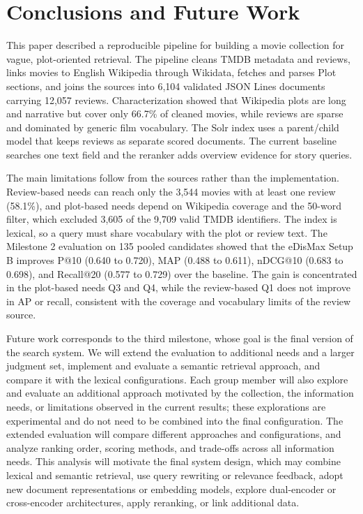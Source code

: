 \documentclass[sigconf]{acmart}
\begin{document}
\section{Conclusions and Future Work}
This paper described a reproducible pipeline for building a movie collection for vague,
plot-oriented retrieval. The pipeline cleans TMDB metadata and reviews, links movies to
English Wikipedia through Wikidata, fetches and parses Plot sections, and joins the
sources into 6{,}104 validated JSON Lines documents carrying 12{,}057 reviews.
Characterization showed that Wikipedia plots are long and narrative but cover only
66.7\% of cleaned movies, while reviews are sparse and dominated by generic film
vocabulary. The Solr index uses a parent/child model that keeps reviews as separate
scored documents. The current baseline searches one text field and the reranker
adds overview evidence for story queries.

The main limitations follow from the sources rather than the implementation. Review-based
needs can reach only the 3{,}544 movies with at least one review (58.1\%), and plot-based
needs depend on Wikipedia coverage and the 50-word filter, which excluded 3{,}605 of the
9{,}709 valid TMDB identifiers. The index is lexical, so a query must share vocabulary
with the plot or review text. The Milestone 2 evaluation on 135 pooled candidates showed that the
eDisMax Setup B improves P@10 (0.640 to 0.720), MAP (0.488 to 0.611), nDCG@10 (0.683
to 0.698), and Recall@20 (0.577 to 0.729) over the baseline. The gain is concentrated
in the plot-based needs Q3 and Q4, while the review-based Q1 does not improve in AP
or recall, consistent with the coverage and vocabulary limits of the review source.

Future work corresponds to the third milestone, whose goal is the final
version of the search system. We will extend the evaluation to additional needs and a
larger judgment set, implement and evaluate a semantic retrieval approach, and compare
it with the lexical configurations. Each group member will also explore and evaluate an
additional approach motivated by the collection, the information needs, or limitations
observed in the current results; these explorations are experimental and do not need to
be combined into the final configuration. The extended evaluation will compare different
approaches and configurations, and analyze ranking order, scoring methods, and trade-offs
across all information needs. This analysis will motivate the final system design, which may combine
lexical and semantic retrieval, use query rewriting or relevance feedback, adopt new
document representations or embedding models, explore dual-encoder or cross-encoder
architectures, apply reranking, or link additional data.



\end{document}
